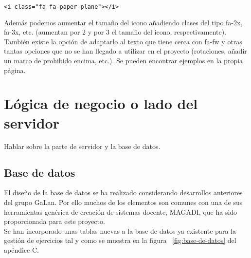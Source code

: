 \lstset{language=HTML}
\begin{lstlisting}[frame=single]
<i class="fa fa-paper-plane"></i>
\end{lstlisting}

Además podemos aumentar el tamaño del icono añadiendo clases del tipo fa-2x, fa-3x, etc. (aumentan por 2 y por 3 el tamaño del icono, respectivamente). También existe la opción de adaptarlo al texto que tiene cerca con fa-fw y otras tantas opciones que no se han llegado a utilizar en el proyecto (rotaciones, añadir un marco de prohibido encima, etc.). Se pueden encontrar ejemplos en la propia página.\\

\section{Lógica de negocio o lado del servidor}
\label{diseno-e-implementacion:logica-negocio}

Hablar sobre la parte de servidor y la base de datos.\\

\subsection{Base de datos}
\label{diseno-e-implementacion:logica-negocio:bd}

El diseño de la base de datos se ha realizado considerando desarrollos anteriores del grupo GaLan.
Por ello muchos de los elementos son comunes con una de sus herramientas genérica de creación
de sistemas docente, MAGADI, que ha sido proporcionada para este proyecto.\\

Se han incorporado unas tablas nuevas a la base de datos ya existente para la gestión de ejercicios tal y como se muestra en la figura ~\ref{fig:base-de-datos} del apéndice C.\\